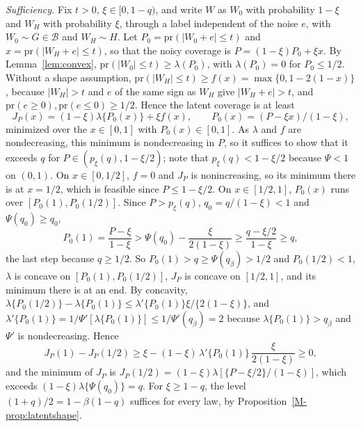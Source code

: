 \documentclass[12pt]{article}
\renewcommand{\_}{\usc\allowbreak}
\theoremstyle{definition}
\numberwithin{equation}{section}
\newcommand{\pr}{\mathrm{pr}}
\newcommand{\B}{\mathcal{B}}
\begin{document}
\emph{Sufficiency.} Fix $t > 0$, $\xi \in [0, 1 - q)$, and write $W$ as $W_0$ with probability $1 - \xi$ and $W_H$ with probability $\xi$, through a label independent of the noise $e$, with $W_0 \sim G \in \B$ and $W_H \sim H$. Let $P_0 = \pr(|W_0 + e| \le t)$ and $x = \pr(|W_H + e| \le t)$, so that the noisy coverage is $P = (1 - \xi)P_0 + \xi x$. By Lemma~\ref{lem:convex}, $\pr(|W_0| \le t) \ge \lambda(P_0)$, with $\lambda(P_0) = 0$ for $P_0 \le 1/2$. Without a shape assumption, $\pr(|W_H| \le t) \ge f(x) = \max\{0, 1 - 2(1 - x)\}$, because $|W_H| > t$ and $e$ of the same sign as $W_H$ give $|W_H + e| > t$, and $\pr(e \ge 0), \pr(e \le 0) \ge 1/2$. Hence the latent coverage is at least
\[
J_P(x) = (1 - \xi)\lambda\{P_0(x)\} + \xi f(x), \qquad P_0(x) = (P - \xi x)/(1 - \xi),
\]
minimized over the $x \in [0, 1]$ with $P_0(x) \in [0, 1]$. As $\lambda$ and $f$ are nondecreasing, this minimum is nondecreasing in $P$, so it suffices to show that it exceeds $q$ for $P \in (p_\xi(q), 1 - \xi/2)$; note that $p_\xi(q) < 1 - \xi/2$ because $\Psi < 1$ on $(0, 1)$. On $x \in [0, 1/2]$, $f = 0$ and $J_P$ is nonincreasing, so its minimum there is at $x = 1/2$, which is feasible since $P \le 1 - \xi/2$. On $x \in [1/2, 1]$, $P_0(x)$ runs over $[P_0(1), P_0(1/2)]$. Since $P > p_\xi(q)$, $q_0 = q/(1 - \xi) < 1$ and $\Psi(q_0) \ge q_0$,
\[
P_0(1) = \frac{P - \xi}{1 - \xi} > \Psi(q_0) - \frac{\xi}{2(1 - \xi)} \ge \frac{q - \xi/2}{1 - \xi} \ge q,
\]
the last step because $q \ge 1/2$. So $P_0(1) > q \ge \Psi(q_\beta) > 1/2$ and $P_0(1/2) < 1$, $\lambda$ is concave on $[P_0(1), P_0(1/2)]$, $J_P$ is concave on $[1/2, 1]$, and its minimum there is at an end. By concavity, $\lambda\{P_0(1/2)\} - \lambda\{P_0(1)\} \le \lambda'\{P_0(1)\}\xi/\{2(1 - \xi)\}$, and $\lambda'\{P_0(1)\} = 1/\Psi'[\lambda\{P_0(1)\}] \le 1/\Psi'(q_\beta) = 2$ because $\lambda\{P_0(1)\} > q_\beta$ and $\Psi'$ is nondecreasing. Hence
\[
J_P(1) - J_P(1/2) \ge \xi - (1 - \xi)\,\lambda'\{P_0(1)\}\,\frac{\xi}{2(1 - \xi)} \ge 0,
\]
and the minimum of $J_P$ is $J_P(1/2) = (1 - \xi)\lambda[\{P - \xi/2\}/(1 - \xi)]$, which exceeds $(1 - \xi)\lambda\{\Psi(q_0)\} = q$. For $\xi \ge 1 - q$, the level $(1 + q)/2 = 1 - \beta(1 - q)$ suffices for every law, by Proposition~\ref{M-prop:latentshape}.
\end{document}
